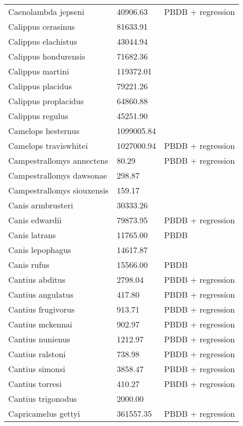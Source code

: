 \documentclass{article}
\begin{document}
\begin{center}
\begin{longtable}{p{} p{} p{} }
  Caenolambda jepseni & 40906.63 & PBDB + regression \\ 
  Calippus cerasinus & 81633.91 & \cite{Tomiya2013} \\ 
  Calippus elachistus & 43044.94 & \cite{Tomiya2013} \\ 
  Calippus hondurensis & 71682.36 & \cite{Tomiya2013} \\ 
  Calippus martini & 119372.01 & \cite{Tomiya2013} \\ 
  Calippus placidus & 79221.26 & \cite{Tomiya2013} \\ 
  Calippus proplacidus & 64860.88 & \cite{Tomiya2013} \\ 
  Calippus regulus & 45251.90 & \cite{Tomiya2013} \\ 
  Camelops hesternus & 1099005.84 & \cite{Smith2004} \\ 
  Camelops traviswhitei & 1027000.94 & PBDB + regression \\ 
  Campestrallomys annectens & 80.29 & PBDB + regression \\ 
  Campestrallomys dawsonae & 298.87 & \cite{Tomiya2013} \\ 
  Campestrallomys siouxensis & 159.17 & \cite{Tomiya2013} \\ 
  Canis armbrusteri & 30333.26 & \cite{Tomiya2013} \\ 
  Canis edwardii & 79873.95 & PBDB + regression \\ 
  Canis latrans & 11765.00 & PBDB \\ 
  Canis lepophagus & 14617.87 & \cite{Tomiya2013} \\ 
  Canis rufus & 15566.00 & PBDB \\ 
  Cantius abditus & 2798.04 & PBDB + regression \\ 
  Cantius angulatus & 417.80 & PBDB + regression \\ 
  Cantius frugivorus & 913.71 & PBDB + regression \\ 
  Cantius mckennai & 902.97 & PBDB + regression \\ 
  Cantius nunienus & 1212.97 & PBDB + regression \\ 
  Cantius ralstoni & 738.98 & PBDB + regression \\ 
  Cantius simonsi & 3858.47 & PBDB + regression \\ 
  Cantius torresi & 410.27 & PBDB + regression \\ 
  Cantius trigonodus & 2000.00 & \cite{Soligo2006} \\ 
  Capricamelus gettyi & 361557.35 & PBDB + regression \\ 

\end{longtable}
\end{center}
\end{document}
